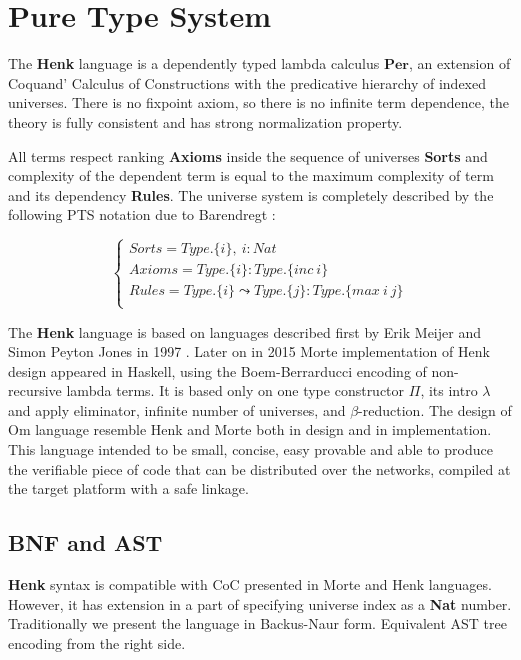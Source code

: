 \documentclass{article}
\begin{document}
\section{Pure Type System}
The {\bf Henk} language is a dependently typed lambda calculus $\mathbf{Per}$, an extension of Coquand' Calculus of Constructions \cite{Coq88} with the predicative hierarchy of indexed universes.
There is no fixpoint axiom, so there is no infinite term dependence, the theory is fully consistent and has strong normalization property.

All terms respect ranking {\bf Axioms} inside the sequence of universes {\bf Sorts} and complexity of the dependent term is equal to the maximum complexity of term and its dependency {\bf Rules}.
The universe system is completely described by the following PTS notation due to Barendregt \cite{Henk93}:

$$
\begin{cases}
Sorts = Type.\{i\},\ i : Nat\\
Axioms = Type.\{i\} : Type.\{inc\ i\}\\
Rules = Type.\{i\} \leadsto Type.\{j\} : Type.\{max\ i\ j\}\\
\end{cases}
$$

The {\bf Henk} language is based on languages described first by Erik Meijer and Simon Peyton Jones in 1997 \cite{Erik97}.
Later on in 2015 Morte implementation of Henk design appeared in Haskell, using the Boem-Berrarducci encoding of non-recursive lambda terms.
It is based only on one type constructor {\bf $\Pi$}, its intro {\bf $\lambda$} and apply eliminator, infinite number of universes, and {\bf $\beta$}-reduction.
The design of Om language resemble Henk and Morte both in design and in implementation.
This language intended to be small, concise, easy provable and able to produce the verifiable piece of code that can be distributed over the networks, compiled at the target platform with a safe linkage.

\subsection{BNF and AST}

{\bf Henk} syntax is compatible with CoC presented in Morte and Henk languages.
However, it has extension in a part of specifying universe index as a {\bf Nat} number.
Traditionally we present the language in Backus-Naur form.
Equivalent AST tree encoding from the right side.
\end{document}
